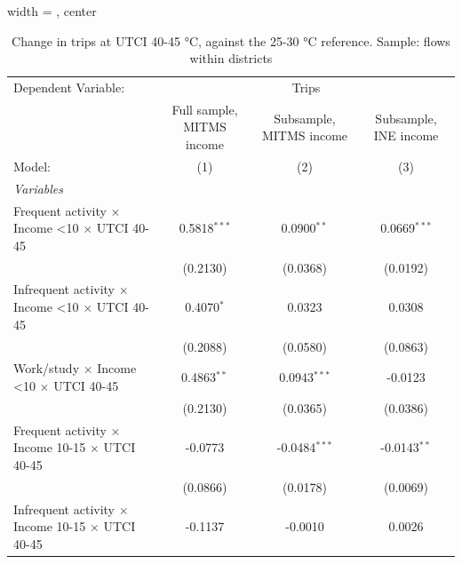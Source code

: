 
\begin{table}[htbp]
   \caption{\label{table_models_abc_40-45} Change in trips at UTCI 40-45 °C, against the 25-30 °C reference. Sample: flows within districts}
   \centering
   \small
   \begin{adjustbox}{width = \textwidth, center}
      \begin{tabular}{lccc}
         \tabularnewline \midrule \midrule
         Dependent Variable: & \multicolumn{3}{c}{Trips}\\
                                                                         & Full sample, MITMS income & Subsample, MITMS income & Subsample, INE income \\   
         Model:                                                          & (1)                       & (2)                     & (3)\\  
         \midrule
         \emph{Variables}\\
         Frequent activity $\times$ Income <10 $\times$ UTCI 40-45       & 0.5818$^{***}$            & 0.0900$^{**}$           & 0.0669$^{***}$\\   
                                                                         & (0.2130)                  & (0.0368)                & (0.0192)\\   
         Infrequent activity $\times$ Income <10 $\times$ UTCI 40-45     & 0.4070$^{*}$              & 0.0323                  & 0.0308\\   
                                                                         & (0.2088)                  & (0.0580)                & (0.0863)\\   
         Work/study $\times$ Income <10 $\times$ UTCI 40-45              & 0.4863$^{**}$             & 0.0943$^{***}$          & -0.0123\\   
                                                                         & (0.2130)                  & (0.0365)                & (0.0386)\\   
         Frequent activity $\times$ Income 10-15 $\times$ UTCI 40-45     & -0.0773                   & -0.0484$^{***}$         & -0.0143$^{**}$\\   
                                                                         & (0.0866)                  & (0.0178)                & (0.0069)\\   
         Infrequent activity $\times$ Income 10-15 $\times$ UTCI 40-45   & -0.1137                   & -0.0010                 & 0.0026\\   

\end{tabular}
\end{adjustbox}
\end{table}
